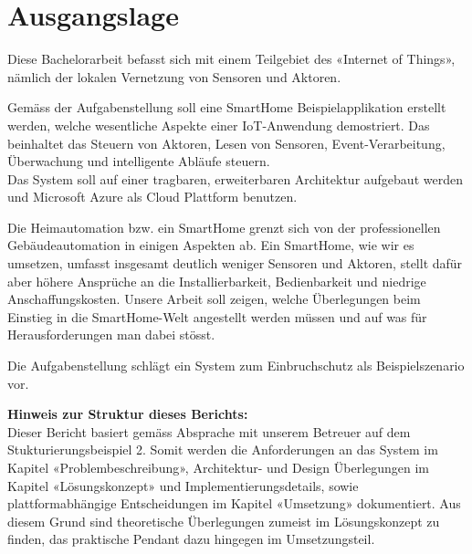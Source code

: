 \section{Ausgangslage}
Diese Bachelorarbeit befasst sich mit einem Teilgebiet des «Internet of Things», nämlich der lokalen Vernetzung von Sensoren und Aktoren.

Gemäss der Aufgabenstellung soll eine SmartHome Beispielapplikation erstellt werden, welche wesentliche Aspekte  einer IoT-Anwendung demostriert. Das beinhaltet das Steuern von Aktoren, Lesen von Sensoren, Event-Verarbeitung, Überwachung und intelligente Abläufe steuern. \\
Das System soll auf einer tragbaren, erweiterbaren Architektur aufgebaut werden und Microsoft Azure als Cloud Plattform benutzen.

Die Heimautomation bzw. ein SmartHome grenzt sich von der professionellen Gebäudeautomation in einigen Aspekten ab. Ein SmartHome, wie wir es umsetzen, umfasst insgesamt deutlich weniger Sensoren und Aktoren, stellt dafür aber höhere Ansprüche an die Installierbarkeit, Bedienbarkeit und niedrige Anschaffungskosten. Unsere Arbeit soll zeigen, welche Überlegungen beim Einstieg in die SmartHome-Welt angestellt werden müssen und auf was für Herausforderungen man dabei stösst.

Die Aufgabenstellung schlägt ein System zum Einbruchschutz als Beispielszenario vor.


\textbf{Hinweis zur Struktur dieses Berichts:}\\
Dieser Bericht basiert gemäss Absprache mit unserem Betreuer auf dem Stukturierungsbeispiel 2. Somit werden die Anforderungen an das System im Kapitel «Problembeschreibung», Architektur- und Design Überlegungen im Kapitel «Lösungskonzept» und Implementierungsdetails, sowie plattformabhängige Entscheidungen im Kapitel «Umsetzung» dokumentiert. Aus diesem Grund sind theoretische Überlegungen zumeist im Lösungskonzept zu finden, das praktische Pendant dazu hingegen im Umsetzungsteil.
